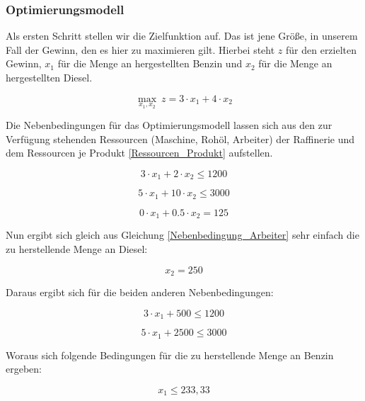 \documentclass{eegreport}
\begin{document}
\subsubsection{Optimierungsmodell}

Als ersten Schritt stellen wir die Zielfunktion auf. Das ist jene Größe, in unserem Fall der Gewinn, den es hier zu maximieren gilt. Hierbei steht $z$ für den erzielten Gewinn, $x_1$ für die Menge an hergestellten Benzin und $x_2$ für die Menge an hergestellten Diesel.

\begin{equation}
\max_{x_1, x_2}\ z = 3 \cdot x_1 + 4 \cdot x_2
\end{equation}

Die Nebenbedingungen für das Optimierungsmodell lassen sich aus den zur Verfügung stehenden Ressourcen (Maschine, Rohöl, Arbeiter) der Raffinerie und dem Ressourcen je Produkt \ref{Ressourcen_Produkt} aufstellen.

\begin{equation}
3 \cdot x_1 + 2 \cdot x_2 \leq 1200
\end{equation}

\begin{equation}
5 \cdot x_1 + 10 \cdot x_2 \leq 3000
\end{equation}

\begin{equation}
0 \cdot x_1 + 0.5 \cdot x_2 = 125
\label{Nebenbedingung_Arbeiter}
\end{equation}

Nun ergibt sich gleich aus Gleichung \ref{Nebenbedingung_Arbeiter} sehr einfach die zu herstellende Menge an Diesel:

\begin{equation}
x_2 = 250
\end{equation}

Daraus ergibt sich für die beiden anderen Nebenbedingungen:

\begin{equation}
3 \cdot x_1 + 500 \leq 1200
\end{equation}

\begin{equation}
5 \cdot x_1 + 2500 \leq 3000
\end{equation}

Woraus sich folgende Bedingungen für die zu herstellende Menge an Benzin ergeben:

\begin{equation}
x_1 \leq 233,33
\label{Nebenbedingung_Benzin_1}
\end{equation}
\end{document}
